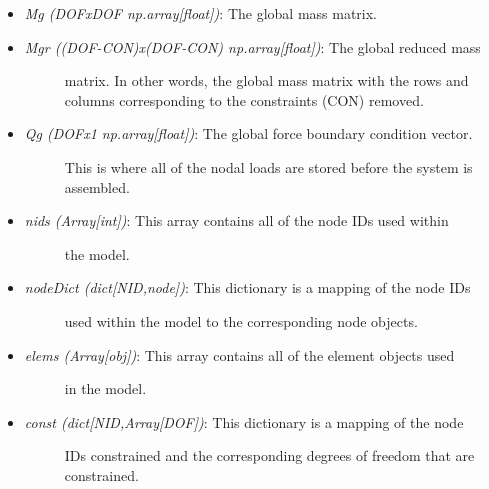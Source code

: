 \documentclass[letterpaper,10pt,english]{sphinxmanual}
\begin{document}
\begin{fulllineitems}
\begin{itemize}
\begin{description}
\end{description}

\item {} 
\emph{Mg (DOFxDOF np.array{[}float{]})}: The global mass matrix.

\item {} \begin{description}
\item[{\emph{Mgr ((DOF-CON)x(DOF-CON) np.array{[}float{]})}: The global reduced mass}] \leavevmode
matrix. In other words, the global mass matrix with the rows and
columns corresponding to the constraints (CON) removed.

\end{description}

\item {} \begin{description}
\item[{\emph{Qg (DOFx1 np.array{[}float{]})}: The global force boundary condition vector.}] \leavevmode
This is where all of the nodal loads are stored before the system is
assembled.

\end{description}

\item {} \begin{description}
\item[{\emph{nids (Array{[}int{]})}: This array contains all of the node IDs used within}] \leavevmode
the model.

\end{description}

\item {} \begin{description}
\item[{\emph{nodeDict (dict{[}NID,node{]})}: This dictionary is a mapping of the node IDs}] \leavevmode
used within the model to the corresponding node objects.

\end{description}

\item {} \begin{description}
\item[{\emph{elems (Array{[}obj{]})}: This array contains all of the element objects used}] \leavevmode
in the model.

\end{description}

\item {} \begin{description}
\item[{\emph{const (dict{[}NID,Array{[}DOF{]})}: This dictionary is a mapping of the node}] \leavevmode
IDs constrained and the corresponding degrees of freedom that are
constrained.


\end{description}
\end{itemize}
\end{fulllineitems}
\end{document}
